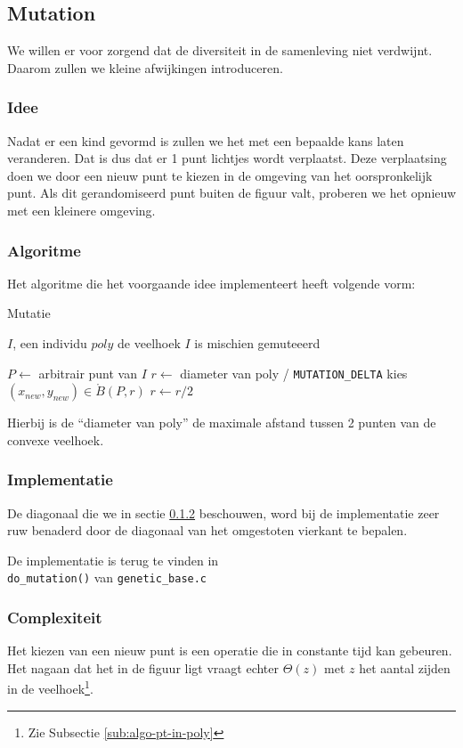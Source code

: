 %
\subsection{Mutation}
\label{sub:Mutation}
We willen er voor zorgend dat de diversiteit in de samenleving niet verdwijnt. Daarom zullen we kleine afwijkingen introduceren.

\subsubsection{Idee}
Nadat er een kind gevormd is zullen we het met een bepaalde kans laten veranderen. Dat is dus dat er 1 punt lichtjes wordt verplaatst. Deze verplaatsing doen we door een nieuw punt te kiezen in de omgeving van het oorspronkelijk punt. Als dit gerandomiseerd punt buiten de figuur valt, proberen we het opnieuw met een kleinere omgeving.

\subsubsection{Algoritme}
\label{ssub:MutationAlgorithm}
Het algoritme die het voorgaande idee implementeert heeft volgende vorm:
	\begin{algorithm}[H]
	 	\caption{Mutatie}
		\begin{algorithmic}
		\Require \State $I$, een individu \State $poly$ de veelhoek
		\Ensure $I$ is mischien gemuteeerd 
		
			\State $P \gets$ arbitrair punt van $I$ 
			\State $r \gets$ diameter van poly / \texttt{MUTATION\_DELTA}
			\Repeat 
			\State kies $(x_{new},y_{new}) \in \mathring{B}(P,r)$
			\State $r \gets r/2$
		\EndIf		
		\end{algorithmic}
		\label{alg:Mutation}
	\end{algorithm}		
Hierbij is de ``diameter van poly'' de maximale afstand tussen 2 punten van de convexe veelhoek.

\subsubsection{Implementatie}
\label{ssub:MutationImplementation}
De diagonaal die we in sectie \ref{ssub:MutationAlgorithm} beschouwen, word bij de implementatie zeer ruw benaderd door de diagonaal van het omgestoten vierkant te bepalen.

De implementatie is terug te vinden in \\
\texttt{do\_mutation()} van \texttt{genetic\_base.c}

\subsubsection{Complexiteit}
\label{ssub:MutationComplexity}
Het kiezen van een nieuw punt is een operatie die in constante tijd kan gebeuren. Het nagaan dat het in de figuur ligt vraagt echter $\Theta(z)$ met $z$ het aantal zijden in de veelhoek\footnote{Zie Subsectie \ref{sub:algo-pt-in-poly}}.

%
